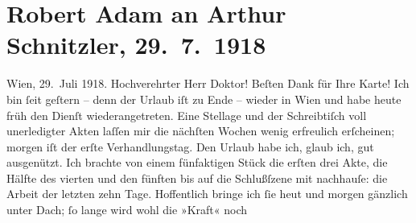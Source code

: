 

         
         \renewcommand{\erwaehntePersonen}{Personen: Robert Adam,  Molière}
         \renewcommand{\erwaehnteOrte}{Orte: Andorf, Wien}
         \renewcommand{\erwaehnteWerke}{Werke: Robert, Yppl. Idylle in fünf Akten}
               \section[Robert Adam an Arthur Schnitzler, 29. 7. 1918]{ Robert Adam an Arthur Schnitzler, 29. 7. 1918}\nopagebreak{}\rehead{ }\begin{ledgroupsized}[t]{13cm}\normalsize\beginnumbering \toendnotes[C]{\smallbreak\pagebreak[2]} 
\toendnotes[C]{\smallbreak}\pstart
           \raggedleft{}{\pb}Wien, 29. Juli 1918.\pend
           \pstart\center{}Hochverehrter Herr Doktor!\pend\pstart
           Beſten Dank für Ihre Karte!\pend
           \pstart
           Ich bin ſeit geſtern – denn der Urlaub iſt zu Ende – wieder in Wien und habe heute früh den Dienſt wiederangetreten. Eine
               Stellage und der Schreibtiſch voll unerledigter Akten laſſen mir die nächſten Wochen
               wenig erfreulich erſcheinen; morgen iſt der erſte Verhandlungstag.\pend
           \pstart
           Den Urlaub habe ich, glaub ich, gut ausgenützt. Ich brachte von einem fünfaktigen Stück die erſten drei Akte, die
               Hälfte des vierten und den fünften bis auf die Schlußſzene mit nachhauſe: die Arbeit
               der letzten zehn Tage. Hoffentlich bringe ich ſie heut und morgen gänzlich unter
               Dach; ſo lange wird wohl die {\pb}»Kraft« noch

\end{ledgroupsized}
